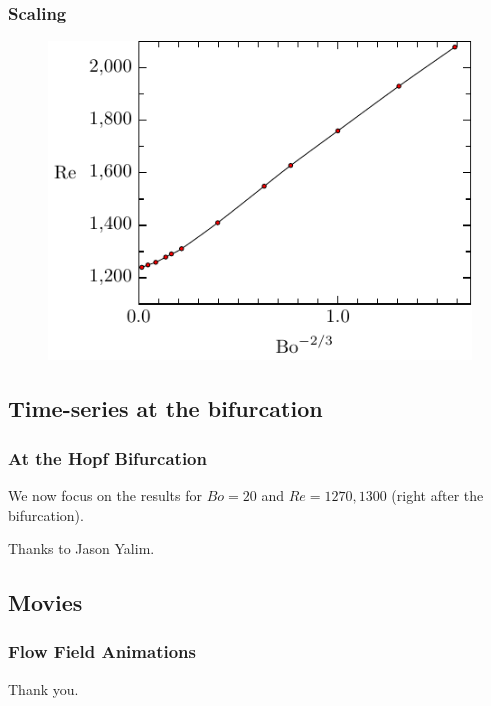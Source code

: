\documentclass[compress]{beamer}
\begin{document}
\begin{frame}\frametitle{Scaling}
\begin{figure}
\centering
\includegraphics[scale=1]{bifCurveScaled_E.pdf}
\end{figure}
\end{frame}

\subsection{Time-series at the bifurcation}
\begin{frame}\frametitle{At the Hopf Bifurcation}
We now focus on the results for $Bo = 20$ and $Re = 1270, 1300$ (right after the bifurcation).

\centering
\href{https://mathpost.asu.edu/~kiko/research/alpha0.html}{}

Thanks to Jason Yalim.
\end{frame}
\subsection{Movies}
\begin{frame}\frametitle{Flow Field Animations}
\end{frame}

\begin{frame}
\centering
\Huge
Thank you.
\end{frame}
\end{document}
